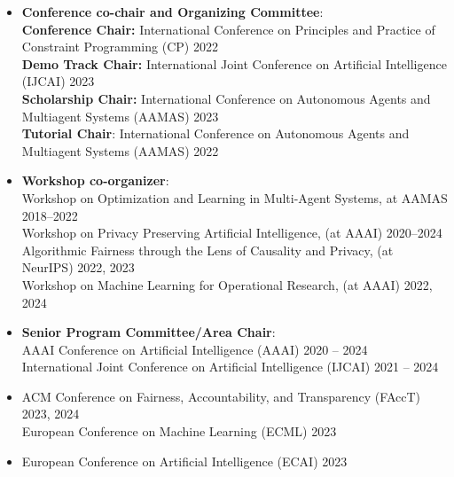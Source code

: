 \documentclass[localFont,alternative]{documentMETADATA}
\begin{document}

  \begin{itemize}
    \item {\bf Conference co-chair and Organizing Committee}:  \\
    {\bf Conference Chair:} International Conference on Principles and Practice of Constraint Programming (CP)  \hfill{2022}\\
    {\bf Demo Track Chair:} International Joint Conference on Artificial Intelligence (IJCAI) \hfill{2023}\\
		{\bf Scholarship Chair:} International Conference on Autonomous Agents and Multiagent Systems (AAMAS) \hfill{2023}\\
		{\bf Tutorial Chair}:  International Conference on Autonomous Agents and Multiagent Systems (AAMAS) \hfill{2022}
		
    \item {\bf Workshop co-organizer}: \\
    {Workshop on Optimization and Learning in Multi-Agent Systems, at AAMAS} \hfill{2018--2022}\\
    {Workshop on Privacy Preserving Artificial Intelligence, (at AAAI)}   \hfill{2020--2024}\\
    {Algorithmic Fairness through the Lens of Causality and Privacy, (at NeurIPS)} \hfill{2022, 2023}\\
    {Workshop on Machine Learning for Operational Research, (at AAAI)}   \hfill{2022, 2024}
    
    \item {\bf Senior Program Committee/Area Chair}: \\
    AAAI Conference on Artificial Intelligence (AAAI) \hfill {2020 -- 2024}\\
    International Joint Conference on Artificial Intelligence (IJCAI) \hfill {2021 -- 2024}\\
    \item ACM Conference on Fairness, Accountability, and Transparency (FAccT) \hfill {2023, 2024}\\
    European Conference on Machine Learning (ECML) \hfill{2023}\\
  	\item European Conference on Artificial Intelligence (ECAI) \hfill {2023}
  \end{itemize}
\end{document}
